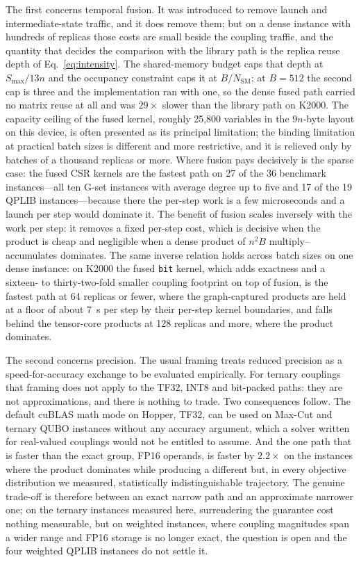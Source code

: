\documentclass[11pt,a4paper]{article}
\newcommand{\code}[1]{\texttt{#1}}
\begin{document}
The first concerns temporal fusion. It was introduced to remove launch and intermediate-state traffic, and it does remove them; but on a dense instance with hundreds of replicas those costs are small beside the coupling traffic, and the quantity that decides the comparison with the library path is the replica reuse depth of Eq.~\eqref{eq:intensity}. The shared-memory budget caps that depth at $S_{\max}/13n$ and the occupancy constraint caps it at $B/N_{\mathrm{SM}}$; at $B=512$ the second cap is three and the implementation ran with one, so the dense fused path carried no matrix reuse at all and was $29\times$ slower than the library path on K2000. The capacity ceiling of the fused kernel, roughly 25,800 variables in the $9n$-byte layout on this device, is often presented as its principal limitation; the binding limitation at practical batch sizes is different and more restrictive, and it is relieved only by batches of a thousand replicas or more. Where fusion pays decisively is the sparse case: the fused CSR kernels are the fastest path on 27 of the 36 benchmark instances---all ten G-set instances with average degree up to five and 17 of the 19 QPLIB instances---because there the per-step work is a few microseconds and a launch per step would dominate it. The benefit of fusion scales inversely with the work per step: it removes a fixed per-step cost, which is decisive when the product is cheap and negligible when a dense product of $n^2B$ multiply--accumulates dominates. The same inverse relation holds across batch sizes on one dense instance: on K2000 the fused \code{bit} kernel, which adds exactness and a sixteen- to thirty-two-fold smaller coupling footprint on top of fusion, is the fastest path at 64 replicas or fewer, where the graph-captured products are held at a floor of about 7~\textmu s per step by their per-step kernel boundaries, and falls behind the tensor-core products at 128 replicas and more, where the product dominates.

The second concerns precision. The usual framing treats reduced precision as a speed-for-accuracy exchange to be evaluated empirically. For ternary couplings that framing does not apply to the TF32, INT8 and bit-packed paths: they are not approximations, and there is nothing to trade. Two consequences follow. The default cuBLAS math mode on Hopper, TF32, can be used on Max-Cut and ternary QUBO instances without any accuracy argument, which a solver written for real-valued couplings would not be entitled to assume. And the one path that is faster than the exact group, FP16 operands, is faster by $2.2\times$ on the instances where the product dominates while producing a different but, in every objective distribution we measured, statistically indistinguishable trajectory. The genuine trade-off is therefore between an exact narrow path and an approximate narrower one; on the ternary instances measured here, surrendering the guarantee cost nothing measurable, but on weighted instances, where coupling magnitudes span a wider range and FP16 storage is no longer exact, the question is open and the four weighted QPLIB instances do not settle it.
\end{document}
